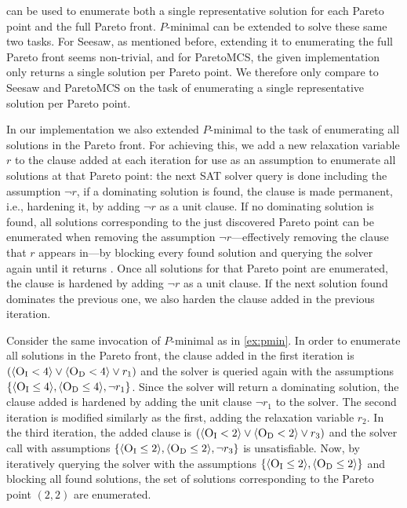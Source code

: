 \algname{} can be used to enumerate both a single representative solution for each Pareto point and the full Pareto front.
$P$-minimal can be extended to solve these same two tasks.
For Seesaw, as mentioned before, extending it to enumerating the full Pareto front seems non-trivial, and for ParetoMCS, the given implementation only returns a single solution per Pareto point.
We therefore only compare to Seesaw and ParetoMCS on the task of enumerating a single representative solution per Pareto point.

In our implementation we also extended $P$-minimal to the task of enumerating all solutions in the Pareto front.
For achieving this, we add a new relaxation variable $r$ to the clause added at each iteration for use as an assumption to enumerate all solutions at that Pareto point:
the next SAT solver query is done including the assumption $\lnot r$, if a dominating solution is found, the clause is made permanent, i.e., hardening it, by adding $\lnot r$ as a unit clause.
If no dominating solution is found, all solutions corresponding to the just discovered Pareto point can be enumerated when removing the assumption $\lnot r$---effectively removing the clause that $r$ appears in---by blocking every found solution and querying the solver again until it returns \unsat{}.
Once all solutions for that Pareto point are enumerated, the clause is hardened by adding $\lnot r$ as a unit clause.
If the next solution found dominates the previous one, we also harden the clause added in the previous iteration.

\begin{example}
  Consider the same invocation of $P$-minimal as in \cref{ex:pmin}.
  In order to enumerate all solutions in the Pareto front, the clause added in the first iteration is $(\langle \textsc{O}_{\text{I}} < 4 \rangle \lor \langle \textsc{O}_{\text{D}} < 4 \rangle \lor r_1)$ and the solver is queried again with the assumptions $\{ \langle \textsc{O}_{\text{I}} \leq 4 \rangle, \langle \textsc{O}_{\text{D}} \leq 4 \rangle, \lnot r_1 \}$.
  Since the solver will return a dominating solution, the clause added is hardened by adding the unit clause $\lnot r_1$ to the solver.
  The second iteration is modified similarly as the first, adding the relaxation variable $r_2$.
  In the third iteration, the added clause is $(\langle \textsc{O}_{\text{I}} < 2 \rangle \lor \langle \textsc{O}_{\text{D}} < 2 \rangle \lor r_3)$ and the solver call with assumptions $\{ \langle \textsc{O}_{\text{I}} \leq 2 \rangle, \langle \textsc{O}_{\text{D}} \leq 2 \rangle, \lnot r_3 \}$ is unsatisfiable.
  Now, by iteratively querying the solver with the assumptions $\{ \langle \textsc{O}_{\text{I}} \leq 2 \rangle, \langle \textsc{O}_{\text{D}} \leq 2 \rangle \}$ and blocking all found solutions, the set of solutions corresponding to the Pareto point $(2,2)$ are enumerated.
\end{example}

